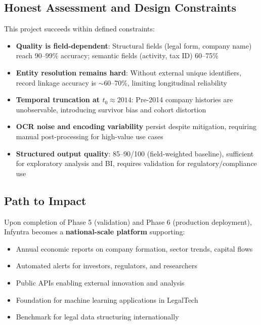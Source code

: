 \documentclass[12pt,a4paper]{report}
\begin{document}
\subsection{Honest Assessment and Design Constraints}

This project succeeds within defined constraints:

\begin{itemize}
    \item \textbf{Quality is field-dependent}: Structural fields (legal form, company name) reach 90--99\% accuracy; semantic fields (activity, tax ID) 60--75\%
    \item \textbf{Entity resolution remains hard}: Without external unique identifiers, record linkage accuracy is $\sim$60--70\%, limiting longitudinal reliability
    \item \textbf{Temporal truncation at $t_0 \approx 2014$}: Pre-2014 company histories are unobservable, introducing survivor bias and cohort distortion
    \item \textbf{OCR noise and encoding variability} persist despite mitigation, requiring manual post-processing for high-value use cases
    \item \textbf{Structured output quality}: 85--90/100 (field-weighted baseline), sufficient for exploratory analysis and BI, requires validation for regulatory/compliance use
\end{itemize}

\subsection{Path to Impact}

Upon completion of Phase 5 (validation) and Phase 6 (production deployment), Infyntra becomes a \textbf{national-scale platform} supporting:

\begin{itemize}
    \item Annual economic reports on company formation, sector trends, capital flows
    \item Automated alerts for investors, regulators, and researchers
    \item Public APIs enabling external innovation and analysis
    \item Foundation for machine learning applications in LegalTech
    \item Benchmark for legal data structuring internationally
\end{itemize}
\end{document}
